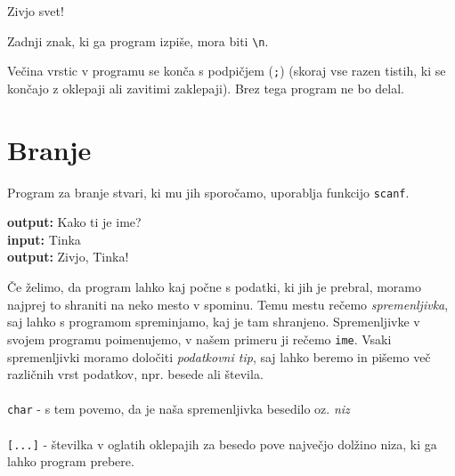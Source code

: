 \begin{examples}


\begin{inout}
\tcblower
Zivjo svet!
\end{inout}

\end{examples}

\begin{errors}
Zadnji znak, ki ga program izpiše, mora biti \verb+\n+.
\end{errors}

\begin{errors}
Večina vrstic v programu se konča s podpičjem (\verb+;+) (skoraj vse razen tistih, ki se končajo z oklepaji  ali zavitimi zaklepaji). Brez tega program ne bo delal.
\end{errors}

\pagebreak
\section{Branje}
Program za branje stvari, ki mu jih sporočamo, uporablja funkcijo \verb+scanf+. 

\begin{examples}


\begin{inout}
{\color{blue} \bf output:} Kako ti je ime?\\
{\color{blue} \bf input:} Tinka \\
{\color{blue} \bf output:} Zivjo, Tinka! 
\end{inout}

\end{examples}


Če želimo, da program lahko kaj počne s podatki, ki jih je prebral, moramo najprej to shraniti na neko mesto v spominu. Temu mestu rečemo \emph{spremenljivka}, saj lahko s programom spreminjamo, kaj je tam shranjeno. Spremenljivke v svojem programu poimenujemo, v našem primeru ji rečemo \verb+ime+. Vsaki spremenljivki moramo določiti \emph{podatkovni tip}, saj lahko beremo in pišemo več različnih vrst podatkov, npr. besede ali števila. \\\\
\verb+char+ - s tem povemo, da je naša spremenljivka besedilo oz. \emph{niz} \\\\
\verb+[...]+ - številka v oglatih oklepajih za besedo pove največjo dolžino niza, ki ga lahko program prebere.

